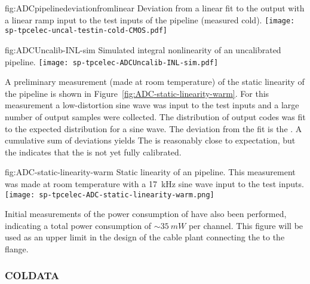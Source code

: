 \begin{dunefigure}
{fig:ADCpipelinedeviationfromlinear}
{Deviation from a linear fit to the  output with a linear ramp input to the test inputs of the
   pipeline (measured cold).}
\texttt{[image: sp-tpcelec-uncal-testin-cold-CMOS.pdf]}
\end{dunefigure}

\begin{dunefigure}
{fig:ADCUncalib-INL-sim}
{Simulated integral nonlinearity of an uncalibrated  pipeline.}
\texttt{[image: sp-tpcelec-ADCUncalib-INL-sim.pdf]}
\end{dunefigure}

A preliminary measurement (made at room temperature) of the static linearity of the  pipeline is
shown in Figure~\ref{fig:ADC-static-linearity-warm}.  For this measurement a low-distortion sine wave was
input to the test inputs and a large number of output samples were collected.  The distribution of output
codes was fit to the expected distribution for a sine wave.  The deviation from the fit is the .
A cumulative sum of deviations yields    The  is reasonably close to expectation,
but the  indicates that the  is not yet fully calibrated.

\begin{dunefigure}
{fig:ADC-static-linearity-warm}
{Static linearity of an  pipeline.  This measurement was made at room temperature with a
\SI{17}{kHz} sine wave input to the test inputs.}
\texttt{[image: sp-tpcelec-ADC-static-linearity-warm.png]}
\end{dunefigure}

Initial measurements of the power consumption of  have also been
performed, indicating a total power consumption of $\sim\SI{35}{mW}$ per channel.
This figure will be used as an upper limit in the design of the cable plant 
connecting the  to the  flange.

\subsubsection{COLDATA }
\label{sec:fdsp-tpcelec-design-femb-coldata}

